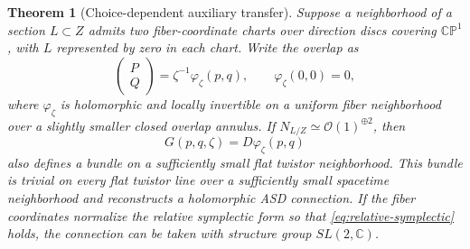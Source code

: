 \documentclass[11pt]{article}
\numberwithin{equation}{section}
\newtheorem{theorem}{Theorem}[section]
\theoremstyle{definition}
\theoremstyle{remark}
\newcommand{\C}{\mathbb C}
\newcommand{\CP}{\mathbb{CP}}
\newcommand{\OO}{\mathcal O}
\begin{document}
\begin{theorem}[Choice-dependent auxiliary transfer]\label{thm:auxiliary}
Suppose a neighborhood of a section $L\subset Z$ admits two fiber-coordinate charts over direction discs covering $\CP^1$, with $L$ represented by zero in each chart. Write the overlap as
\begin{equation}\label{eq:general-gluing}
\begin{pmatrix}P\\Q\end{pmatrix}=\zeta^{-1}\varphi_\zeta(p,q),
\qquad \varphi_\zeta(0,0)=0,
\end{equation}
where $\varphi_\zeta$ is holomorphic and locally invertible on a uniform fiber neighborhood over a slightly smaller closed overlap annulus. If $N_{L/Z}\simeq\OO(1)^{\oplus2}$, then
\begin{equation}\label{eq:reuse-G}
G(p,q,\zeta)=D\varphi_\zeta(p,q)
\end{equation}
also defines a bundle on a sufficiently small flat twistor neighborhood. This bundle is trivial on every flat twistor line over a sufficiently small spacetime neighborhood and reconstructs a holomorphic ASD connection. If the fiber coordinates normalize the relative symplectic form so that \eqref{eq:relative-symplectic} holds, the connection can be taken with structure group $SL(2,\C)$.
\end{theorem}
\end{document}
